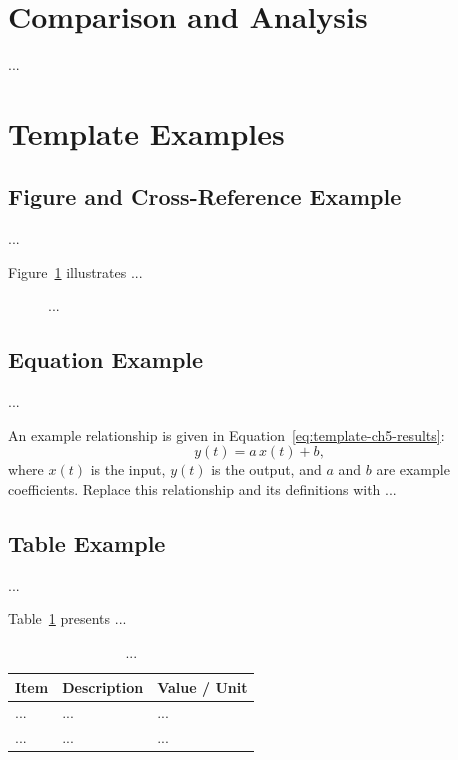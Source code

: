 \section{Comparison and Analysis}
...

\section{Template Examples}
\label{sec:template-ch5-results}

\subsection{Figure and Cross-Reference Example}
...

Figure~\ref{fig:template-ch5-results} illustrates ...
\begin{figure}[htbp]
    \centering
    \caption{...}
    \label{fig:template-ch5-results}
\end{figure}

\subsection{Equation Example}
...

An example relationship is given in Equation~\eqref{eq:template-ch5-results}:
\begin{equation}
    y(t) = a\,x(t) + b,
    \label{eq:template-ch5-results}
\end{equation}
where $x(t)$ is the input, $y(t)$ is the output, and $a$ and $b$ are
example coefficients. Replace this relationship and its definitions with ...

\subsection{Table Example}
...

Table~\ref{tab:template-ch5-results} presents ...
\begin{table}[htbp]
    \centering
    \caption{...}
    \label{tab:template-ch5-results}
    \begin{tabularx}{0.9\linewidth}{lXX}
        \toprule
        \textbf{Item} & \textbf{Description} & \textbf{Value / Unit} \\
        \midrule
        ... & ... & ... \\
        ... & ... & ... \\
        \bottomrule
    \end{tabularx}
\end{table}
